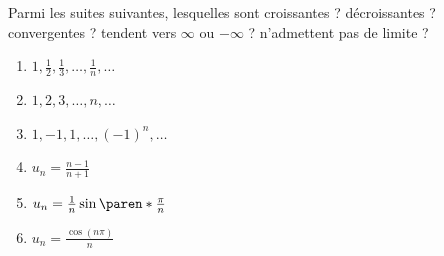 \documentclass[12pt,french,oneside,a4paper]{memoir} %
\begin{document}
\begin{exo}
Parmi les suites suivantes, lesquelles sont croissantes ? décroissantes ? convergentes ? tendent vers $\infty$ ou $-\infty$ ? n'admettent pas de limite ?
\begin{multicols}{2}
  \begin{enumerate}
  \item $1, \frac 12, \frac 13, \ldots, \frac1n, \ldots$
  \item $1,2,3, \ldots, n, \ldots$
  \item $1,-1,1,\ldots,(-1)^{n}, \ldots$
  \item $u_{n} = \frac{n-1}{n+1}$
  \item $u_{n} = \frac 1 n \sin\paren*{\frac{\pi}{n}}$
  \item $u_{n} = \frac{\cos(n\pi)}{n}$
  \end{enumerate}
\end{multicols}


\end{exo}
\end{document}
